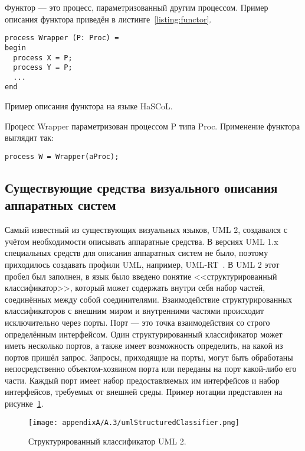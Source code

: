Функтор --- это процесс, параметризованный другим процессом. Пример описания функтора
приведён в листинге~\ref{listing:functor}.

\begin{listing}
\begin{verbatim}
process Wrapper (P: Proc) =
begin
  process X = P;
  process Y = P;
  ...
end
\end{verbatim}
\caption{Пример описания функтора на языке HaSCoL.}
\label{listing:functor}
\end{listing}

Процесс Wrapper параметризован процессом P типа Proc. Применение функтора выглядит так:
\begin{verbatim}
process W = Wrapper(aProc);
\end{verbatim}

\subsection{Существующие средства визуального описания аппаратных систем}
Самый известный из существующих визуальных языков, UML 2, создавался с учётом необходимости 
описывать аппаратные средства. В версиях UML 1.x специальных средств для описания 
аппаратных систем не было, поэтому приходилось создавать профили UML, например, UML-RT~\cite{selic1998using}.
В UML 2 этот пробел был заполнен, в язык было введено понятие <<структурированный классификатор>>, 
который может содержать внутри себя набор частей, соединённых между собой соединителями. 
Взаимодействие структурированных классификаторов с внешним миром и внутренними частями 
происходит исключительно через порты. Порт --- это точка взаимодействия со строго 
определённым интерфейсом. Один структурированный классификатор может иметь несколько 
портов, а также имеет возможность определить, на какой из портов пришёл запрос. Запросы, 
приходящие на порты, могут быть обработаны непосредственно объектом-хозяином порта 
или переданы на порт какой-либо его части. Каждый порт имеет набор предоставляемых 
им интерфейсов и набор интерфейсов, требуемых от внешней среды. Пример нотации представлен 
на рисунке~\ref{image:umlStructuredClassifier}.

\begin{figure} [ht]
	\begin{center}
		\texttt{[image: appendixA/A.3/umlStructuredClassifier.png]}
		\caption{Структурированный классификатор UML 2.}
		\label{image:umlStructuredClassifier}
	\end{center}
\end{figure}

